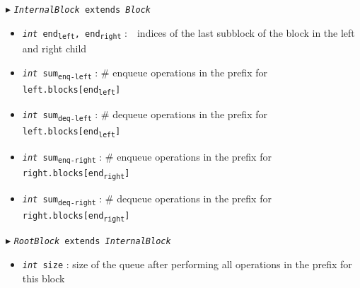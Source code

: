 \documentclass[10pt]{article}
\newcommand{\sub}[1]{\textsubscript{#1}}
\renewcommand{\tt}[1]{\texttt{#1}}
\renewcommand{\sl}[1]{\textsl{#1}}
\newcommand{\size}{size}
\theoremstyle{definition}
\begin{document}
\begin{algorithm}
\begin{algorithmic}[1]
\begin{multicols}{2}
\Statex $\blacktriangleright$ \tt{\sl{InternalBlock} extends \sl{Block}}
\begin{itemize}
    \item \tt{\sl{int} end\sub{left}, end\sub{right}}
  \textsf{:~~indices of the last subblock of the block in the left and right child}
  \item \tt{\sl{int} sum\sub{enq-left}}
  \textsf{: \# enqueue operations in the prefix for \tt{left.blocks[end\sub{left}]}}
  \item \tt{\sl{int} sum\sub{deq-left}}
  \textsf{: \# dequeue operations in the prefix for \tt{left.blocks[end\sub{left}]}}
  \item \tt{\sl{int} sum\sub{enq-right}}
  \textsf{: \# enqueue operations in the prefix for \tt{right.blocks[end\sub{right}]}}
  \item \tt{\sl{int} sum\sub{deq-right}}
  \textsf{: \# dequeue operations in the prefix for \tt{right.blocks[end\sub{right}]}}
\end{itemize}


\Statex $\blacktriangleright$ \tt{\sl{RootBlock} extends \sl{InternalBlock}}
\begin{itemize}
  \item \tt{\sl{int} \size}
  \textsf{: size of the queue after performing all operations in the prefix for this block}
\end{itemize}



\end{multicols}
\end{algorithmic}
\end{algorithm}
\end{document}
